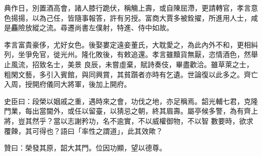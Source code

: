 \begin{pinyinscope}
 典作日，別置酒高會，諸人膝行跪伏，稱觴上壽，或自陳屈滯，更請轉官，孝言意色揚揚，以為己任，皆隨事報答，許有另授。富商大賈多被銓擢，所進用人士，咸是麤險放縱之流。尋遷尚書左僕射，特進、侍中如故。



 孝言富貴豪侈，尤好女色。後娶婁定遠妾董氏，大耽愛之，為此內外不和，更相糾列，坐爭免官，徙光州。隆化敗後，有敕追還。孝言雖黷貨無厭，恣情酒色，然舉止風流，招致名士，美景
 良辰，未嘗虛棄，賦詩奏伎，畢盡歡洽。雖草萊之士，粗閑文藝，多引入賓館，與同興賞，其貧躓者亦時有乞遺。世論復以此多之。齊亡入周，授開府儀同大將軍，後加上開府。



 史臣曰：段榮以姻戚之重，遇時來之會，功伐之地，亦足稱焉。韶光輔七君，克隆門業，每出當閫外，或任以留臺，以猜忌之朝，終其眉壽。屬亭候多警，為有齊上將，豈其然乎？當以志謝矜功，名不逾實，不以威權御物，不以智
 數要時，欲求覆餗，其可得也？語曰「率性之謂道」，此其效歟？



 贊曰：榮發其原，韶大其門。位因功顯，望以德尊。



\end{pinyinscope}